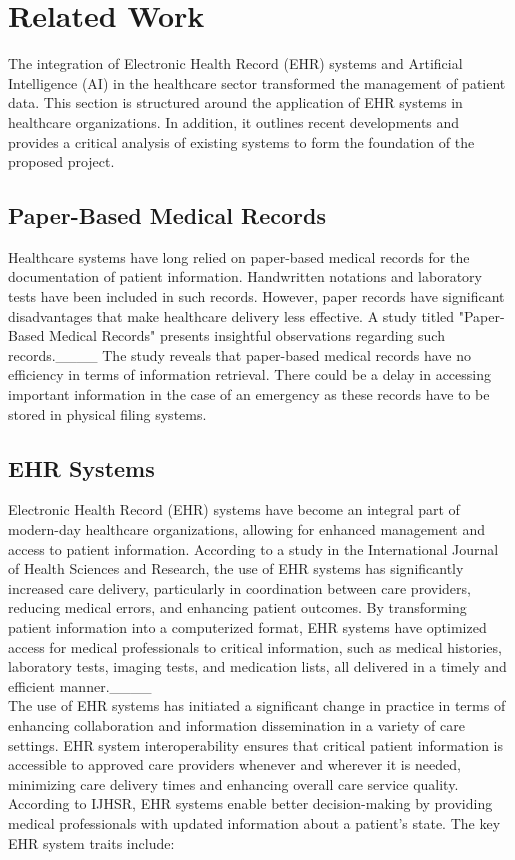 \section{Related Work}
The integration of Electronic Health Record (EHR) systems and Artificial Intelligence (AI) in the healthcare sector transformed the management of patient data. This section is structured around the application of EHR systems in healthcare organizations. In addition, it outlines recent developments and provides a critical analysis of existing systems to form the foundation of the proposed project.
\subsection{Paper-Based Medical Records}
Healthcare systems have long relied on paper-based medical records for the documentation of patient information. Handwritten notations and laboratory tests have been included in such records. However, paper records have significant disadvantages that make healthcare delivery less effective. A study titled "Paper-Based Medical Records"  presents insightful observations regarding such records.____
The study reveals that paper-based medical records have no efficiency in terms of information retrieval. There could be a delay in accessing important information in the case of an emergency as these records have to be stored in physical filing systems.
\subsection{EHR Systems}
Electronic Health Record (EHR) systems have become an integral part of modern-day healthcare organizations, allowing for enhanced management and access to patient information. According to a study in the International Journal of Health Sciences and Research, the use of EHR systems has significantly increased care delivery, particularly in coordination between care providers, reducing medical errors, and enhancing patient outcomes. By transforming patient information into a computerized format, EHR systems have optimized access for medical professionals to critical information, such as medical histories, laboratory tests, imaging tests, and medication lists, all delivered in a timely and efficient manner.____\\ 
The use of EHR systems has initiated a significant change in practice in terms of enhancing collaboration and information dissemination in a variety of care settings. EHR system interoperability ensures that critical patient information is accessible to approved care providers whenever and wherever it is needed, minimizing care delivery times and enhancing overall care service quality. According to IJHSR, EHR systems enable better decision-making by providing medical professionals with updated information about a patient's state.
The key EHR system traits include:

